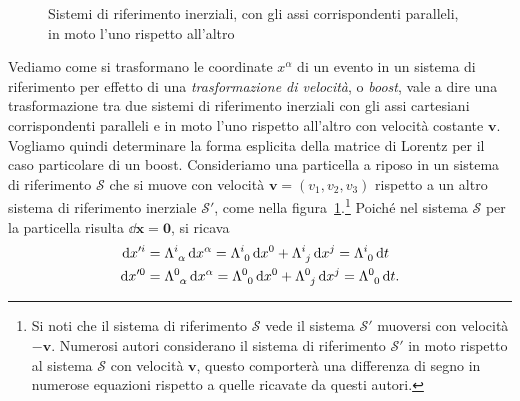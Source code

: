 \begin{figure}
  \centering
  \caption[Sistemi di riferimento inerziali in moto l'uno rispetto
  all'altro]{Sistemi di riferimento inerziali, con gli assi corrispondenti
    paralleli, in moto l'uno rispetto all'altro}
  \label{fig:trasformazioni-lorentz}
\end{figure}
Vediamo come si trasformano le coordinate $x^{\alpha}$ di un evento in un
sistema di riferimento per effetto di una \emph{trasformazione di velocità}, o
\emph{boost}, vale a dire una trasformazione tra due sistemi di
riferimento inerziali con gli assi cartesiani corrispondenti paralleli e in moto
l'uno rispetto all'altro con velocità costante $\bm{v}$.  Vogliamo quindi
determinare la forma esplicita della matrice di Lorentz per il caso particolare
di un boost.  Consideriamo una particella a riposo in un sistema di riferimento
$\mathcal{S}$ che si muove con velocità $\bm{v} = (v_{1},v_{2},v_{3})$ rispetto
a un altro sistema di riferimento inerziale $\mathcal{S}'$, come nella
figura~\ref{fig:trasformazioni-lorentz}.\footnote{Si noti che il sistema di
  riferimento $\mathcal{S}$ vede il sistema $\mathcal{S}'$ muoversi con velocità
  $-\bm{v}$.  Numerosi autori considerano il sistema di riferimento
  $\mathcal{S}'$ in moto rispetto al sistema $\mathcal{S}$ con velocità
  $\bm{v}$, questo comporterà una differenza di segno in numerose equazioni
  rispetto a quelle ricavate da questi autori.}
Poiché nel sistema $\mathcal{S}$ per la particella risulta $\dd\bm{x} = \bm{0}$,
si ricava
\begin{subequations}
  \begin{align}
    \dd x'^{i} &= \tensor{\Lambda}{^{i}_{\alpha}}\dd x^{\alpha} =
    \tensor{\Lambda}{^{i}_{0}}\dd x^{0} + \tensor{\Lambda}{^{i}_{j}}\dd x^{j} =
    \tensor{\Lambda}{^{i}_{0}}\dd t \\
    \dd x'^{0} &= \tensor{\Lambda}{^{0}_{\alpha}}\dd x^{\alpha} =
    \tensor{\Lambda}{^{0}_{0}}\dd x^{0} + \tensor{\Lambda}{^{0}_{j}}\dd x^{j} =
    \tensor{\Lambda}{^{0}_{0}}\dd t.
  \end{align}
\end{subequations}
